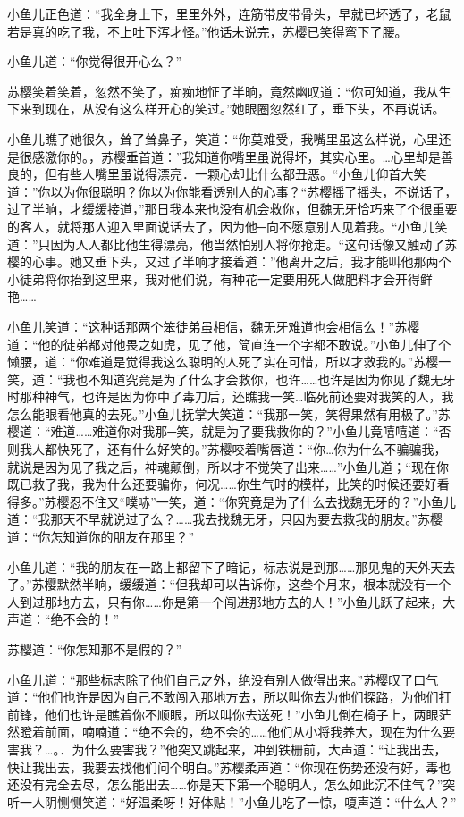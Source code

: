 \documentclass[12pt,oneside]{book}
\begin{document}
小鱼儿正色道：``我全身上下，里里外外，连筋带皮带骨头，早就已坏透了，老鼠若是真的吃了我，不上吐下泻才怪。''他话未说完，苏樱已笑得弯下了腰。

小鱼儿道：``你觉得很开心么？''

苏樱笑着笑着，忽然不笑了，痴痴地怔了半晌，竟然幽叹道：``你可知道，我从生下来到现在，从没有这么样开心的笑过。''她眼圈忽然红了，垂下头，不再说话。

小鱼儿瞧了她很久，耸了耸鼻子，笑道：``你莫难受，我嘴里虽这么样说，心里还是很感激你的。，苏樱垂首道：''我知道你嘴里虽说得坏，其实心里。\ldots 心里却是善良的，但有些人嘴里虽说得漂亮．一颗心却比什么都丑恶。``小鱼儿仰首大笑道：''你以为你很聪明？你以为你能看透别人的心事？``苏樱摇了摇头，不说话了，过了半晌，才缓缓接道，''那日我本来也没有机会救你，但魏无牙恰巧来了个很重要的客人，就将那人迎入里面说话去了，因为他─向不愿意别人见着我。``小鱼儿笑道：''只因为人人都比他生得漂亮，他当然怕别人将你抢走。``这句话像又触动了苏樱的心事。她又垂下头，又过了半响才接着道：''他离开之后，我才能叫他那两个小徒弟将你抬到这里来，我对他们说，有种花一定要用死人做肥料才会开得鲜艳\ldots\ldots{}

小鱼儿笑道：``这种话那两个笨徒弟虽相信，魏无牙难道也会相信么！''苏樱道：``他的徒弟都对他畏之如虎，见了他，简直连一个字都不敢说。''小鱼儿伸了个懒腰，道：``你难道是觉得我这么聪明的人死了实在可惜，所以才救我的。''苏樱一笑，道：``我也不知道究竟是为了什么才会救你，也许\ldots\ldots 也许是因为你见了魏无牙时那种神气，也许是因为你中了毒刀后，还瞧我一笑\ldots 临死前还要对我笑的人，我怎么能眼看他真的去死。''小鱼儿抚掌大笑道：``我那一笑，笑得果然有用极了。''苏樱道：``难道\ldots\ldots 难道你对我那─笑，就是为了要我救你的？''小鱼儿竟嘻嘻道：``否则我人都快死了，还有什么好笑的。''苏樱咬着嘴唇道：``你\ldots 你为什么不骗骗我，就说是因为见了我之后，神魂颠倒，所以才不觉笑了出来\ldots\ldots{}''小鱼儿道；``现在你既已救了我，我为什么还要骗你，何况\ldots\ldots 你生气时的模样，比笑的时候还要好看得多。''苏樱忍不住又``噗哧''一笑，道：``你究竟是为了什么去找魏无牙的？''小鱼儿道：``我那天不早就说过了么？\ldots\ldots 我去找魏无牙，只因为要去救我的朋友。''苏樱道：``你怎知道你的朋友在那里？''

小鱼儿道：``我的朋友在一路上都留下了暗记，标志说是到那\ldots\ldots 那见鬼的天外天去了。''苏樱默然半晌，缓缓道：``但我却可以告诉你，这叁个月来，根本就没有一个人到过那地方去，只有你\ldots\ldots 你是第一个闯进那地方去的人！''小鱼儿跃了起来，大声道：``绝不会的！''

苏樱道：``你怎知那不是假的？''

小鱼儿道：``那些标志除了他们自己之外，绝没有别人做得出来。''苏樱叹了口气道：``他们也许是因为自己不敢闯入那地方去，所以叫你去为他们探路，为他们打前锋，他们也许是瞧着你不顺眼，所以叫你去送死！''小鱼儿倒在椅子上，两眼茫然瞪着前面，喃喃道：``绝不会的，绝不会的\ldots\ldots 他们从小将我养大，现在为什么要害我？\ldots。．为什么要害我？''他突又跳起来，冲到铁栅前，大声道：``让我出去，快让我出去，我要去找他们问个明白。''苏樱柔声道：``你现在伤势还没有好，毒也还没有完全去尽，怎么能出去\ldots\ldots 你是天下第一个聪明人，怎么如此沉不住气？''突听一人阴恻恻笑道：``好温柔呀！好体贴！''小鱼儿吃了一惊，嗄声道：``什么人？''
\end{document}
